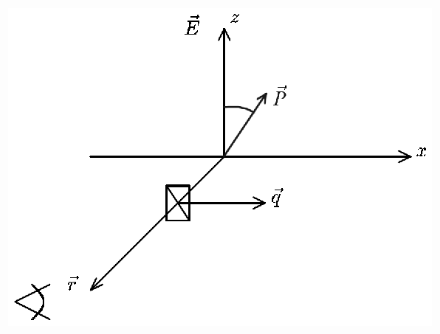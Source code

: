 \begin{figure}[tbp]
\centerline{\hbox{\includegraphics[scale=0.9]{Ris/ris_eps/ris4_1_06.eps}}}

\end{figure}

